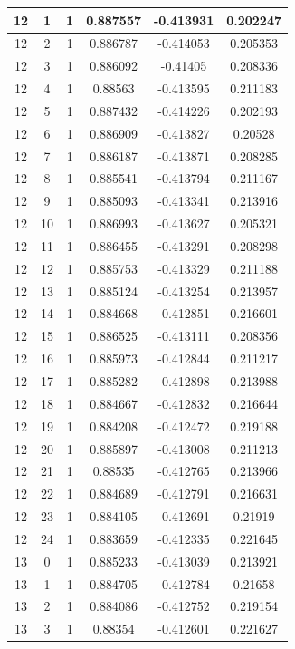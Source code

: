 \documentclass[12pt,a4paper]{article}
\numberwithin{equation}{section}
\numberwithin{figure}{section}
\numberwithin{table}{section}
\begin{document}
\begin{longtable}{|c|c|c|c|c|c|}
12 & 1 & 1 & 0.887557 & -0.413931 & 0.202247 \\ \hline
12 & 2 & 1 & 0.886787 & -0.414053 & 0.205353 \\ \hline
12 & 3 & 1 & 0.886092 & -0.41405 & 0.208336 \\ \hline
12 & 4 & 1 & 0.88563 & -0.413595 & 0.211183 \\ \hline
12 & 5 & 1 & 0.887432 & -0.414226 & 0.202193 \\ \hline
12 & 6 & 1 & 0.886909 & -0.413827 & 0.20528 \\ \hline
12 & 7 & 1 & 0.886187 & -0.413871 & 0.208285 \\ \hline
12 & 8 & 1 & 0.885541 & -0.413794 & 0.211167 \\ \hline
12 & 9 & 1 & 0.885093 & -0.413341 & 0.213916 \\ \hline
12 & 10 & 1 & 0.886993 & -0.413627 & 0.205321 \\ \hline
12 & 11 & 1 & 0.886455 & -0.413291 & 0.208298 \\ \hline
12 & 12 & 1 & 0.885753 & -0.413329 & 0.211188 \\ \hline
12 & 13 & 1 & 0.885124 & -0.413254 & 0.213957 \\ \hline
12 & 14 & 1 & 0.884668 & -0.412851 & 0.216601 \\ \hline
12 & 15 & 1 & 0.886525 & -0.413111 & 0.208356 \\ \hline
12 & 16 & 1 & 0.885973 & -0.412844 & 0.211217 \\ \hline
12 & 17 & 1 & 0.885282 & -0.412898 & 0.213988 \\ \hline
12 & 18 & 1 & 0.884667 & -0.412832 & 0.216644 \\ \hline
12 & 19 & 1 & 0.884208 & -0.412472 & 0.219188 \\ \hline
12 & 20 & 1 & 0.885897 & -0.413008 & 0.211213 \\ \hline
12 & 21 & 1 & 0.88535 & -0.412765 & 0.213966 \\ \hline
12 & 22 & 1 & 0.884689 & -0.412791 & 0.216631 \\ \hline
12 & 23 & 1 & 0.884105 & -0.412691 & 0.21919 \\ \hline
12 & 24 & 1 & 0.883659 & -0.412335 & 0.221645 \\ \hline
13 & 0 & 1 & 0.885233 & -0.413039 & 0.213921 \\ \hline
13 & 1 & 1 & 0.884705 & -0.412784 & 0.21658 \\ \hline
13 & 2 & 1 & 0.884086 & -0.412752 & 0.219154 \\ \hline
13 & 3 & 1 & 0.88354 & -0.412601 & 0.221627 \\ \hline

\end{longtable}
\end{document}
